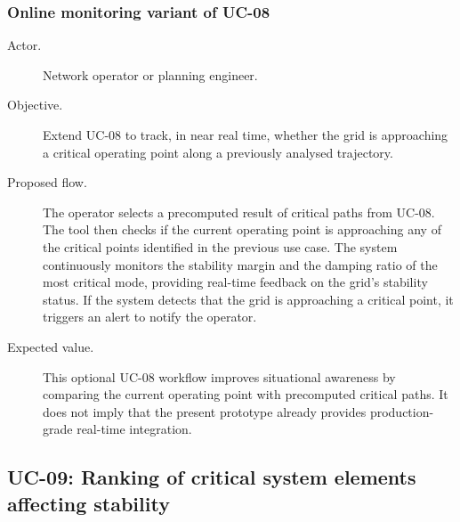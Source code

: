 \subsubsection{Online monitoring variant of UC-08}


\begin{description}
  \item[Actor.] Network operator or planning engineer.
  \item[Objective.] Extend UC-08 to track, in near real time, whether the grid is approaching a critical operating point along a previously analysed trajectory.
  \item[Proposed flow.] The operator selects a precomputed result of critical paths from UC-08. The tool then checks if the current operating point is approaching any of the critical points identified in the previous use case. The system continuously monitors the stability margin and the damping ratio of the most critical mode, providing real-time feedback on the grid's stability status. If the system detects that the grid is approaching a critical point, it triggers an alert to notify the operator.
  \item[Expected value.] This optional UC-08 workflow improves situational awareness by comparing the current operating point with precomputed critical paths. It does not imply that the present prototype already provides production-grade real-time integration.
\end{description}

\subsection{UC-09: Ranking of critical system elements affecting stability}

